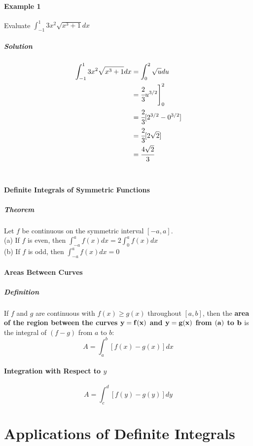 \documentclass{article}
\begin{document}
            \paragraph{Example 1} Evaluate $\int_{-1}^1 3x^2\sqrt{x^3+1}dx$
                \subparagraph{Solution}
                \begin{equation}
                    \begin{aligned}
                        \int_{-1}^1 3x^2\sqrt{x^3+1}dx&=\int_0^2\sqrt{u}du\\
                        &=\cfrac{2}{3}u^{3/2}\Bigg ]_0^2\\
                        &=\cfrac{2}{3}[2^{3/2}-0^{3/2}]\\
                        &=\cfrac{2}{3}[2\sqrt{2}]\\
                        &=\cfrac{4\sqrt{2}}{3}
                    \end{aligned}
                \end{equation}\\
            \paragraph{Definite Integrals of Symmetric Functions}
                \subparagraph{Theorem} Let $f$ be continuous on the symmetric interval $[-a,a]$.\\
                (a) If $f$ is even, then $\int_{-a}^af(x)dx=2\int_0^af(x)dx$\\
                (b) If $f$ is odd, then $\int_{-a}^af(x)dx=0$
            \paragraph{Areas Between Curves}
                \subparagraph{Definition} If $f$ and $g$ are continuous with $f(x)\ge g(x)$ throughout $[a,b]$, then the \textbf{area of the region between the curves $\bf{y=f(x)}$ and $\bf{y=g(x)}$ from $\bf(a)$ to $\bf{b}$} is the integral of $(f-g)$ from $a$ to $b$:
                \[A=\int_a^b[f(x)-g(x)]dx\]
            \paragraph{Integration with Respect to $y$}
                \[A=\int_c^d [f(y)-g(y)]dy\]
    
    \newpage
    \section{Applications of Definite Integrals}
\end{document}
